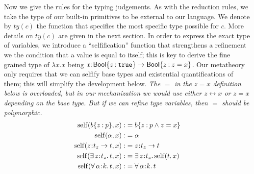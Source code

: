 \documentclass[11pt]{article}
\newcommand{\al}{\alpha}
\newcommand{\bind}{\hspace{0.05em}{:}\hspace{0.05em}} %
\newcommand{\col}{\mathbin{:}}       %
\newcommand{\true}{\mathtt{true}}
\newcommand{\Bool}{{\sf Bool}}
\newcommand{\existype}[3]{\exists\, #1\bind #2.\, #3}
\newcommand{\polytype}[3]{\forall\, #1\bind #2.\, #3}
\newcommand{\functype}[3]{#1\bind #2 \rightarrow #3}
\newcommand{\letin}[3]{{\tt let}\,#1\hspace{0.1em}{=}\hspace{0.1em}#2\,{\tt in}\,#3}
\begin{document}
Now we give the rules for the typing judgements. As with the reduction rules, we take the type of our built-in primitives to be external to our language. We denote by $ty(c)$ the function that specifies the most specific type possible for $c$. More details on $ty(c)$ are given in the next section.
In order to express the exact type of variables, we introduce a ``selfification'' function that strengthens a refinement we the condition that a value is equal to itself; this is key to derive the fine grained type of $\lambda x.x$ being $x\bind\Bool\{z\col \true\} \rightarrow \Bool\{z \col z = x\}$. Our metatheory only requires that we can selfify base types and existential quantifications of them; this will simplify the development below. 
{\em The $=$ in the $z=x$ definition below is overloaded, but in our mechanization we would use either $z\leftrightarrow x$ or $z=x$ depending on the base type. But if we can refine type variables, then  $=$ should be polymorphic.}
\begin{align*}
{\rm self}(b\{z\col p\}, x):&= b\{z\col p \wedge z = x\} \\
{\rm self}(\al, x) :&= \al \\
{\rm self}(\functype{z}{t_z}{t}, x) :&= \functype{z}{t_z}{t} \\
{\rm self}(\existype{z}{t_z}{t}, x) :&= \existype{z}{t_z}{{\rm self}(t, x)} \\
{\rm self}(\polytype{\al}{k}{t}, x) :&= \polytype{\al}{k}{t} 
\end{align*}

\end{document}
